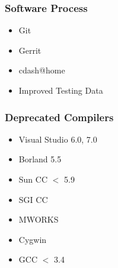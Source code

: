 





{
\begin{frame}
\frametitle{Software Process}
\Huge
\begin{itemize}
\item Git
\pause
\item Gerrit
\pause
\item cdash@home
\pause
\item Improved Testing Data
\end{itemize}
\end{frame}
}








{
\begin{frame}
\frametitle{Deprecated Compilers}
\Huge
\begin{itemize}
\item Visual Studio 6.0, 7.0
\item Borland 5.5
\item Sun CC $<$ 5.9
\item SGI CC
\item MWORKS
\item Cygwin
\item GCC $<$ 3.4
\end{itemize}
\end{frame}
}



